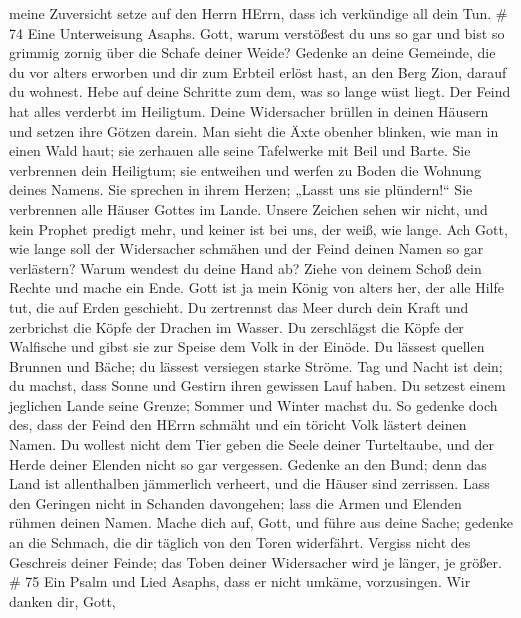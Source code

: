 meine Zuversicht setze auf den Herrn HErrn, dass ich verkündige all dein
Tun. \# 74  Eine Unterweisung Asaphs. Gott, warum verstößest
du uns so gar und bist so grimmig zornig über die Schafe deiner Weide?
 Gedenke an deine Gemeinde, die du vor alters erworben und
dir zum Erbteil erlöst hast, an den Berg Zion, darauf du wohnest.
 Hebe auf deine Schritte zum dem, was so lange wüst liegt.
Der Feind hat alles verderbt im Heiligtum.  Deine
Widersacher brüllen in deinen Häusern und setzen ihre Götzen darein.
 Man sieht die Äxte obenher blinken, wie man in einen Wald
haut;  sie zerhauen alle seine Tafelwerke mit Beil und
Barte.  Sie verbrennen dein Heiligtum; sie entweihen und
werfen zu Boden die Wohnung deines Namens.  Sie sprechen in
ihrem Herzen; „Lasst uns sie plündern!{}`` Sie verbrennen alle Häuser
Gottes im Lande.  Unsere Zeichen sehen wir nicht, und kein
Prophet predigt mehr, und keiner ist bei uns, der weiß, wie lange.
 Ach Gott, wie lange soll der Widersacher schmähen und der
Feind deinen Namen so gar verlästern?  Warum wendest du
deine Hand ab? Ziehe von deinem Schoß dein Rechte und mache ein Ende.
 Gott ist ja mein König von alters her, der alle Hilfe tut,
die auf Erden geschieht.  Du zertrennst das Meer durch dein
Kraft und zerbrichst die Köpfe der Drachen im Wasser.  Du
zerschlägst die Köpfe der Walfische und gibst sie zur Speise dem Volk in
der Einöde.  Du lässest quellen Brunnen und Bäche; du
lässest versiegen starke Ströme.  Tag und Nacht ist dein;
du machst, dass Sonne und Gestirn ihren gewissen Lauf haben.
 Du setzest einem jeglichen Lande seine Grenze; Sommer und
Winter machst du.  So gedenke doch des, dass der Feind den
HErrn schmäht und ein töricht Volk lästert deinen Namen. 
Du wollest nicht dem Tier geben die Seele deiner Turteltaube, und der
Herde deiner Elenden nicht so gar vergessen.  Gedenke an
den Bund; denn das Land ist allenthalben jämmerlich verheert, und die
Häuser sind zerrissen.  Lass den Geringen nicht in Schanden
davongehen; lass die Armen und Elenden rühmen deinen Namen.
 Mache dich auf, Gott, und führe aus deine Sache; gedenke
an die Schmach, die dir täglich von den Toren widerfährt. 
Vergiss nicht des Geschreis deiner Feinde; das Toben deiner Widersacher
wird je länger, je größer. \# 75  Ein Psalm und Lied Asaphs,
dass er nicht umkäme, vorzusingen.  Wir danken dir, Gott,
